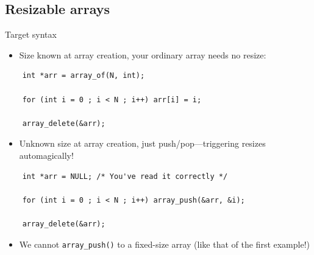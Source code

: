 \subsection{Resizable arrays}

\begin{frame}[fragile]{Target syntax}

  \begin{itemize}
  \item Size known at array creation, your ordinary array needs no resize:
  \end{itemize}
  \begin{lstlisting}
    int *arr = array_of(N, int);

    for (int i = 0 ; i < N ; i++) arr[i] = i;

    array_delete(&arr);
  \end{lstlisting}

  \begin{itemize}
  \item Unknown size at array creation, just push/pop---triggering resizes automagically!
  \end{itemize}
  \begin{lstlisting}
    int *arr = NULL; /* You've read it correctly */

    for (int i = 0 ; i < N ; i++) array_push(&arr, &i);

    array_delete(&arr);
  \end{lstlisting}

  \begin{itemize}
  \item We cannot \lstinline{array_push()} to a fixed-size array (like that of the first example!)
  \end{itemize}

\end{frame}


